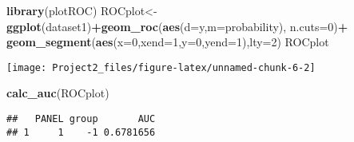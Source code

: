 \documentclass[
]{article}
\newenvironment{Shaded}{\begin{snugshade}}{\end{snugshade}}
\newcommand{\DataTypeTok}[1]{\textcolor[rgb]{0.13,0.29,0.53}{#1}}
\newcommand{\DecValTok}[1]{\textcolor[rgb]{0.00,0.00,0.81}{#1}}
\newcommand{\KeywordTok}[1]{\textcolor[rgb]{0.13,0.29,0.53}{\textbf{#1}}}
\newcommand{\NormalTok}[1]{#1}
\newcommand{\OperatorTok}[1]{\textcolor[rgb]{0.81,0.36,0.00}{\textbf{#1}}}
\begin{document}
\begin{Shaded}
\begin{Highlighting}[]
\KeywordTok{library}\NormalTok{(plotROC)}
\NormalTok{ROCplot<-}\KeywordTok{ggplot}\NormalTok{(dataset1)}\OperatorTok{+}\KeywordTok{geom_roc}\NormalTok{(}\KeywordTok{aes}\NormalTok{(}\DataTypeTok{d=}\NormalTok{y,}\DataTypeTok{m=}\NormalTok{probability), }\DataTypeTok{n.cuts=}\DecValTok{0}\NormalTok{)}\OperatorTok{+}
\KeywordTok{geom_segment}\NormalTok{(}\KeywordTok{aes}\NormalTok{(}\DataTypeTok{x=}\DecValTok{0}\NormalTok{,}\DataTypeTok{xend=}\DecValTok{1}\NormalTok{,}\DataTypeTok{y=}\DecValTok{0}\NormalTok{,}\DataTypeTok{yend=}\DecValTok{1}\NormalTok{),}\DataTypeTok{lty=}\DecValTok{2}\NormalTok{)}
\NormalTok{ROCplot}
\end{Highlighting}
\end{Shaded}

\begin{center}\texttt{[image: Project2\_files/figure-latex/unnamed-chunk-6-2]} \end{center}

\begin{Shaded}
\begin{Highlighting}[]
\KeywordTok{calc_auc}\NormalTok{(ROCplot)}
\end{Highlighting}
\end{Shaded}

\begin{verbatim}
##   PANEL group       AUC
## 1     1    -1 0.6781656
\end{verbatim}
\end{document}
